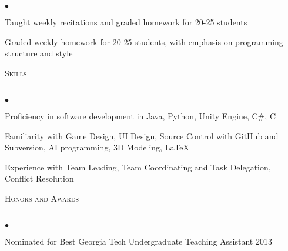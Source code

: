 \documentclass{article}
\newcommand{\lineunder}{\vspace*{-8pt} \\ \hspace*{-18pt} \hrulefill \\}
\newcommand{\header}[1]{{\hspace*{-15pt}\vspace*{6pt} \textsc{#1}} \vspace*{-6pt} \lineunder}
\newenvironment{achievements}{\begin{list}{$\bullet$}{\topsep 0pt \itemsep -2pt}}{\vspace*{4pt}\end{list}}
\begin{document}
	\begin{achievements}
	\item Taught weekly recitations and graded homework for 20-25 students
	\item Graded weekly homework for 20-25 students, with emphasis on programming structure and style
	\end{achievements}

\vspace*{18pt}
\header{Skills}
\begin{achievements}
\item Proficiency in software development in Java, Python, Unity Engine, C\#, C
\item Familiarity with Game Design, UI Design, Source Control with GitHub and Subversion, AI programming, 3D Modeling, \LaTeX
\item Experience with Team Leading, Team Coordinating and Task Delegation, Conflict Resolution
\end{achievements}

\vspace*{18pt}
\header{Honors and Awards}
\begin{achievements}
\item  Nominated for Best Georgia Tech Undergraduate Teaching Assistant 2013
\end{achievements}
\end{document}
